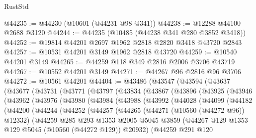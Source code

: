 \begin{lexlean}{RustStd}
\begin{coremodule}
@44235 := @44230 (@10601 (@44231 @98 @341))
@44238 := @12288 @44100 @2688 @3120
@44244 := @44235 (@10485 (@44238 @341 @280 @3852 @3418))
@44252 := @19814 @44201 @2697 @1962 @2818 @2820 @3418 @43720 @2843
@44257 := @10531 @44201 @3149 @1962 @2818 @43720
@44259 := @10540 @44201 @3149
@44265 := @44259 @118 @349 @2816 @2006 @3706 @43719
@44267 := @10552 @44201 @3149
@44271 := @44267 @96 @2816 @96 @3706
@44272 := @10561 @44201
@44404 := @43486
    (@43547
      (@43594
        (@43637
          (@43677
            (@43731
              (@43771
                (@43797
                  (@43834
                    (@43867
                      (@43896
                        (@43925
                          (@43946
                            (@43962
                              (@43976
                                (@43980
                                  (@43984
                                    (@43988
                                      (@43992
                                        (@44028
                                          (@44099
                                            (@44182
                                              (@44200
                                                (@44244
                                                  (@44252
                                                    (@44257
                                                      (@44265
                                                        (@44271 (@10560 (@44272 @96)) @12332)
                                                        (@44259
                                                          @285
                                                          @293
                                                          @1353
                                                          @2005
                                                          @5045
                                                          @3859
                                                          (@44267
                                                            @129
                                                            @1353
                                                            @129
                                                            @5045
                                                            (@10560 (@44272 @129))
                                                            @20932)
                                                          (@44259
                                                            @291
                                                            @120

\end{coremodule}
\end{lexlean}
